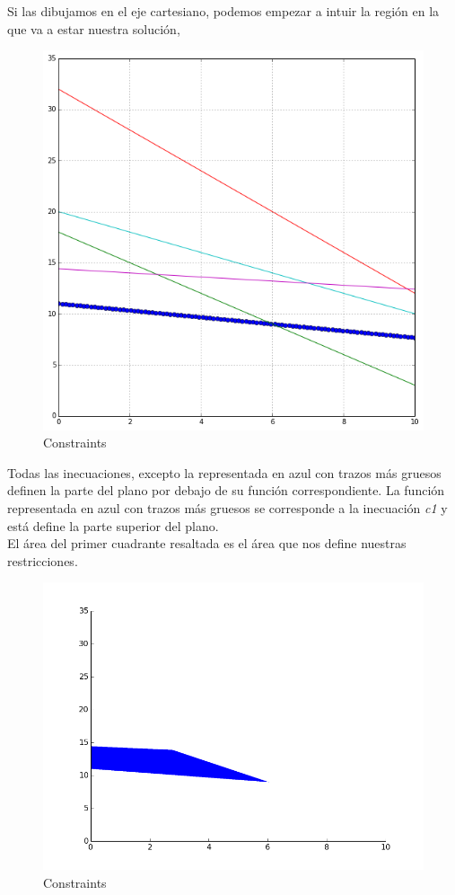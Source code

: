 \documentclass[a4paper,12pt]{article}
\begin{document}
Si las dibujamos en el eje cartesiano, podemos empezar a intuir la regi\'on en la que va a estar nuestra soluci\'on,

\begin{figure}[h]
  \centering
	\includegraphics[scale=0.4]{constraints.png}
	  \caption{Constraints}
\end{figure}

Todas las inecuaciones, excepto la representada en azul con trazos m\'as gruesos definen la parte del plano por debajo de su funci\'on correspondiente. La funci\'on representada en azul con trazos m\'as gruesos se corresponde a la inecuaci\'on \textit{c1} y est\'a define la parte superior del plano.\\

El \'area del primer cuadrante resaltada es el \'area que nos define nuestras restricciones.
\begin{figure}[h]
  \centering
	\includegraphics[scale=0.5]{constraints_area.png}
	  \caption{Constraints}
\end{figure}
\end{document}

